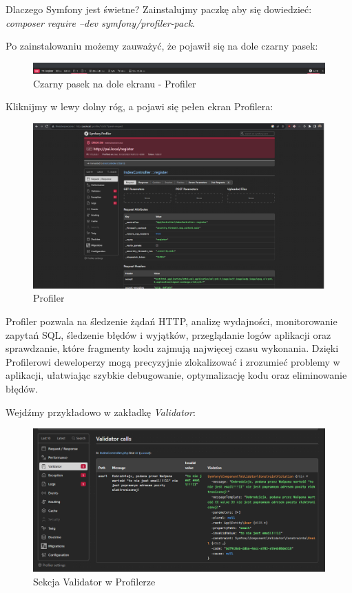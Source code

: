 \documentclass[polish, a4paper]{article}
\begin{document}
Dlaczego Symfony jest świetne? Zainstalujmy paczkę aby się dowiedzieć: \emph{composer require --dev symfony/profiler-pack}.

Po zainstalowaniu możemy zauważyć, że pojawił się na dole czarny pasek:

\begin{figure}[H]
  \centering
  \includegraphics[width=\textwidth]{profiler.png}
  \caption{Czarny pasek na dole ekranu - Profiler}
\end{figure}

Kliknijmy w lewy dolny róg, a pojawi się pełen ekran Profilera:

\begin{figure}[H]
  \centering
  \includegraphics[width=\textwidth]{profiler2.png}
  \caption{Profiler}
\end{figure}

Profiler pozwala na śledzenie żądań HTTP, analizę wydajności, monitorowanie zapytań SQL, śledzenie błędów i wyjątków, przeglądanie logów aplikacji oraz sprawdzanie, które fragmenty kodu zajmują najwięcej czasu wykonania. Dzięki Profilerowi deweloperzy mogą precyzyjnie zlokalizować i zrozumieć problemy w aplikacji, ułatwiając szybkie debugowanie, optymalizację kodu oraz eliminowanie błędów.

Wejdźmy przykładowo w zakładkę \emph{Validator}:

\begin{figure}[H]
  \centering
  \includegraphics[width=\textwidth]{validator.png}
  \caption{Sekcja Validator w Profilerze}
\end{figure}
\end{document}
